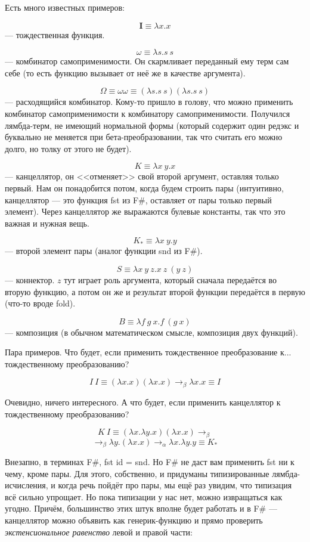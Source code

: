 \documentclass[a5paper]{article}
\begin{document}
Есть много известных примеров:

$$\textbf{I} \equiv \lambda x.x$$
--- тождественная функция.

$$\omega \equiv \lambda s.s\ s$$
--- комбинатор самоприменимости. Он скармливает переданный ему терм сам себе (то есть функцию вызывает от неё же в качестве аргумента).

$$\Omega \equiv \omega\omega \equiv (\lambda s.s\ s) (\lambda s.s\ s)$$
--- расходящийся комбинатор. Кому-то пришло в голову, что можно применить комбинатор самоприменимости к комбинатору самоприменимости. Получился лямбда-терм, не имеющий нормальной формы (который содержит один редэкс и буквально не меняется при бета-преобразовании, так что считать его можно долго, но толку от этого не будет).

$$K \equiv \lambda x\ y.x$$
--- канцеллятор, он <<отменяет>> свой второй аргумент, оставляя только первый. Нам он понадобится потом, когда будем строить пары (интуитивно, канцеллятор --- это функция fst из F\#, оставляет от пары только первый элемент). Через канцеллятор же выражаются булевые константы, так что это важная и нужная вещь.

$$K_\ast \equiv \lambda x\ y.y$$
--- второй элемент пары (аналог функции snd из F\#).

$$S \equiv \lambda x\ y\ z. x\ z\ (y\ z)$$
--- коннектор. $z$ тут играет роль аргумента, который сначала передаётся во вторую функцию, а потом он же и результат второй функции передаётся в первую (что-то вроде fold).

$$B \equiv \lambda f\ g\ x. f\ (g\ x)$$
--- композиция (в обычном математическом смысле, композиция двух функций).

Пара примеров. Что будет, если применить тождественное преобразование к... тождественному преобразованию?

$$I\ I \equiv (\lambda x.x) (\lambda x.x) \rightarrow_\beta \lambda x.x \equiv I$$

Очевидно, ничего интересного. А что будет, если применить канцеллятор к тождественному преобразованию?

$$K\ I \equiv (\lambda x.\lambda y.x) (\lambda x.x) \rightarrow_\beta $$
$$\rightarrow_\beta \lambda y.(\lambda x.x) \rightarrow_\alpha \lambda x.\lambda y.y \equiv K_\ast$$

Внезапно, в терминах F\#, fst id = snd. Но F\# не даст вам применить fst ни к чему, кроме пары. Для этого, собственно, и придуманы типизированные лямбда-исчисления, и когда речь пойдёт про пары, мы ещё раз увидим, что типизация всё сильно упрощает. Но пока типизации у нас нет, можно извращаться как угодно. Причём, большинство этих штук вполне будет работать и в F\# --- канцеллятор можно объявить как генерик-функцию и прямо проверить \textit{экстенсиональное равенство} левой и правой части:
\end{document}
